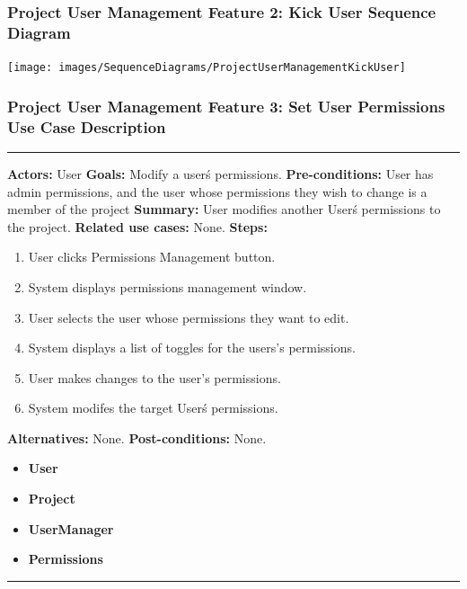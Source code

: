 \documentclass[twoside,letterpaper]{article}
\begin{document}
\subsubsection[Project User Management Feature 2: Kick User Sequence Diagram]{\rmfamily\bfseries\color{black}
	Project User Management Feature 2: Kick User Sequence Diagram}
\hypertarget{RefHeading22059017292}{}
\texttt{[image: images/SequenceDiagrams/ProjectUserManagementKickUser]}
\newpage

\subsubsection[Project User Management Feature 3: Set User Permissions Use Case Description ]{\rmfamily\bfseries\color{black}
	Project User Management Feature 3: Set User Permissions Use Case Description}
\hypertarget{RefHeading22059017292}{}

\vspace{2pt}
\hrule
\vspace{8pt}
 \textbf{Actors:} User \newline
\textbf{Goals:} Modify a user\'s permissions. \newline
 \textbf{Pre-conditions:} User has admin permissions, and the user whose permissions they wish to change is a member of the project\newline
 \textbf{Summary:} User modifies another User\'s permissions to the project. \newline
 \textbf{Related use cases:} None. \newline
\textbf{Steps:} \begin{enumerate}
  \item User clicks Permissions Management button.
  \item System displays permissions management window.
  \item User selects the user whose permissions they want to edit.
  \item System displays a list of toggles for the users's permissions.
  \item User makes changes to the user's permissions.
  \item System modifes the target User\'s permissions.
 \end{enumerate}
 \textbf{Alternatives:} None. \newline
 \textbf{Post-conditions:} None. \newline
\begin{itemize}
	\item \textbf{User}
	\item \textbf{Project}
	\item \textbf{UserManager}
	\item \textbf{Permissions}
\end{itemize}
\vspace{8pt}
\hrule
\newpage
\end{document}
